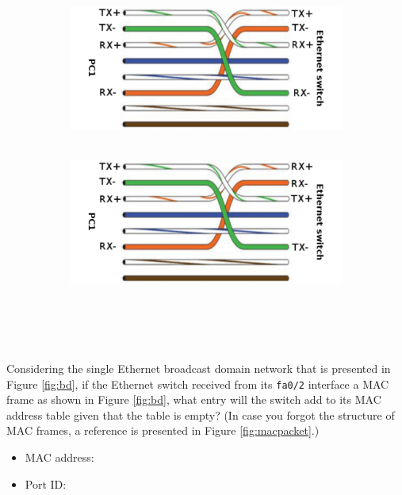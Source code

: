 \documentclass[pdftex,12pt,a4paper]{article}
\begin{document}
\begin{figure}[tbh]
            \begin{subfigure}{.5\textwidth}
              \centering
              \includegraphics[width=.95\textwidth]{figures/fig1c}
              \caption{\ }
              \label{fig:sub3}
            \end{subfigure}%
            \begin{subfigure}{.5\textwidth}
              \centering
              \includegraphics[width=.95\textwidth]{figures/fig1d}
              \caption{\ }
              \label{fig:sub4}
            \end{subfigure}
        \end{figure}

        \newpage

    \section{}
        Considering the single Ethernet broadcast domain network that is
        presented in Figure \ref{fig:bd}, if the Ethernet switch received from
        its \texttt{fa0/2} interface a MAC frame as shown in Figure
        \ref{fig:bd}, what entry will the switch add to its MAC address table
        given that the table is empty? (In case you forgot the structure of MAC
        frames, a reference is presented in Figure \ref{fig:macpacket}.)

        \begin{itemize}
            \item MAC address:
            \item Port ID:
        \end{itemize}
\end{document}
